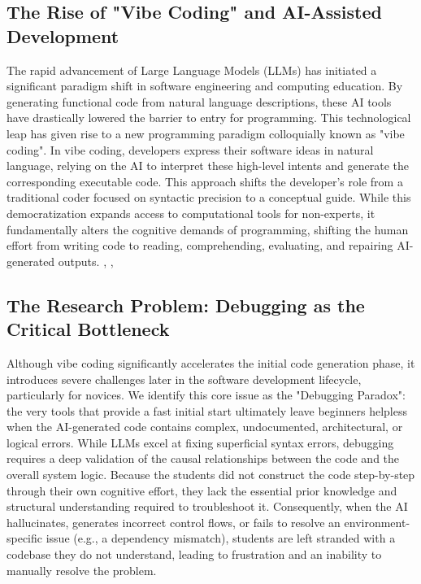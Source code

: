 \documentclass[../tanulmany.tex]{subfiles}
\begin{document}
\subsection{The Rise of "Vibe Coding" and AI-Assisted Development}

The rapid advancement of Large Language Models (LLMs) has initiated a significant paradigm shift in software engineering and computing education.
By generating functional code from natural language descriptions, these AI tools have drastically lowered the barrier to entry for programming.
This technological leap has given rise to a new programming paradigm colloquially known as "vibe coding". 
In vibe coding, developers express their software ideas in natural language, relying on the AI to interpret these high-level intents and generate the corresponding executable code.
This approach shifts the developer's role from a traditional coder focused on syntactic precision to a conceptual guide.
While this democratization expands access to computational tools for non-experts, 
it fundamentally alters the cognitive demands of programming, shifting the human effort from writing code to reading, comprehending, evaluating, and repairing AI-generated outputs.
\cite{fortes2025vibe}, \cite{kazemitabaar2023studying}, \cite{lau2023from} 

\subsection{The Research Problem: Debugging as the Critical Bottleneck}

Although vibe coding significantly accelerates the initial code generation phase, it introduces severe challenges later in the software development lifecycle, particularly for novices.
We identify this core issue as the "Debugging Paradox": the very tools that provide a fast initial start ultimately leave beginners helpless when the AI-generated code contains complex, undocumented, architectural, or logical errors.
While LLMs excel at fixing superficial syntax errors, debugging requires a deep validation of the causal relationships between the code and the overall system logic.
Because the students did not construct the code step-by-step through their own cognitive effort, they lack the essential prior knowledge and structural understanding required to troubleshoot it.
Consequently, when the AI hallucinates, generates incorrect control flows, or fails to resolve an environment-specific issue (e.g., a dependency mismatch), students are left stranded with a codebase they do not understand, leading to frustration and an inability to manually resolve the problem.
\cite{prather2024widening}
\end{document}
